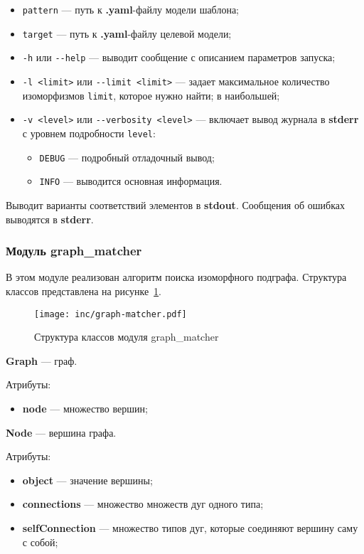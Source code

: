 \begin{itemize}
\item \verb;pattern; --- путь к \textbf{.yaml}-файлу модели шаблона;
\item \verb;target; --- путь к \textbf{.yaml}-файлу целевой модели;
\item \verb;-h; или \verb;--help; --- выводит сообщение с описанием параметров
запуска;
\item \verb;-l <limit>; или \verb;--limit <limit>; --- задает максимальное
количество изоморфизмов \verb;limit;, которое нужно найти;
в наибольшей;
\item \verb;-v <level>; или \verb;--verbosity <level>; --- включает вывод
журнала в \textbf{stderr} с уровнем подробности \verb;level;:
\begin{itemize}
\item \verb;DEBUG; --- подробный отладочный вывод;
\item \verb;INFO; --- выводится основная информация.
\end{itemize}
\end{itemize}

Выводит варианты соответствий элементов в \textbf{stdout}.
Сообщения об ошибках выводятся в \textbf{stderr}.

\subsubsection{Модуль graph\_matcher}

В этом модуле реализован алгоритм поиска изоморфного подграфа.
Структура классов представлена на рисунке~\ref{fig:graph-matcher}.

\begin{figure}[!ht]
\centering
\texttt{[image: inc/graph-matcher.pdf]}
\caption{Структура классов модуля graph\_matcher}
\label{fig:graph-matcher}
\end{figure}

\textbf{Graph} --- граф.

Атрибуты:
\begin{itemize}
\item \textbf{node} --- множество вершин;
\end{itemize}

\textbf{Node} --- вершина графа.

Атрибуты:
\begin{itemize}
\item \textbf{object} --- значение вершины;
\item \textbf{connections} --- множество множеств дуг одного типа;
\item \textbf{selfConnection} --- множество типов дуг, которые соединяют вершину саму с собой;
\end{itemize}

